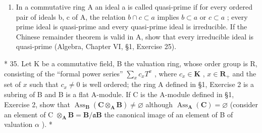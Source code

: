 \begin{enumerate}
\def\labelenumi{\arabic{enumi}.}
\setcounter{enumi}{33}
\tightlist
\item
  In a commutative ring A an ideal a is called quasi-prime if for every ordered pair of ideals b, c of A, the relation \(b \cap c \subset a\) implies \(b \subset a\) or \(c \subset a\) ; every prime ideal is quasi-prime and every quasi-prime ideal is irreducible. If the Chinese remainder theorem is valid in A, show that every irreducible ideal is quasi-prime (Algebra, Chapter VI, §1, Exercise 25).
\end{enumerate}

* 35. Let K be a commutative field, B the valuation ring, whose order group is R, consisting of the ``formal power series'' \(\sum_{x} c_{x} T^{x}\) , where \(c_{x} \in \mathbf{K}\) , \(x \in \mathbf{R}_{+}\) and the set of \(x\) such that \(c_{x} \neq 0\) is well ordered; the ring A defined in §1, Exercise 2 is a subring of B and B is a flat A-module. If C is the A-module defined in §1, Exercise 2, show that \(\operatorname{Ass}_{\mathbf{B}}(\mathbf{C} \otimes_{\mathbf{A}} \mathbf{B}) \neq \varnothing\) although \(\operatorname{Ass}_{\mathbf{A}}(\mathbf{C}) = \varnothing\) (consider an element of C \(\otimes_{\mathbf{A}} \mathbf{B} = \mathbf{B}/\mathfrak{a}\mathbf{B}\) the canonical image of an element of B of valuation \(\alpha\) ). *

